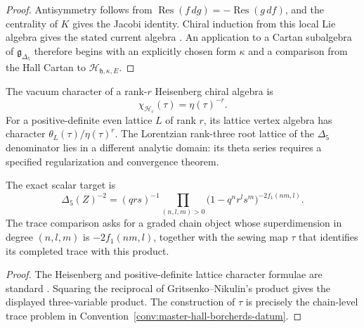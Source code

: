 \begin{proof}
Antisymmetry follows from
$\operatorname{Res}(f\,dg)=-\operatorname{Res}(g\,df)$, and the
centrality of $K$ gives the Jacobi identity.  Chiral induction from
this local Lie algebra gives the stated current algebra
\cite[\S2.5]{FrenkelBenZvi}.  An application to a Cartan subalgebra of
$\mathfrak g_{\Delta_5}$ therefore begins with an explicitly chosen
form $\kappa$ and a comparison from the Hall Cartan to
$\mathcal H_{\mathfrak h,\kappa,E}$.
\end{proof}

\begin{lemma}
\label{lem:master-tau-cartan-window}
The vacuum character of a rank-$r$ Heisenberg chiral algebra is
\[
 \chi_{\mathcal H_r}(\tau)=\eta(\tau)^{-r}.
\]
For a positive-definite even lattice $L$ of rank $r$, its lattice
vertex algebra has character $\theta_L(\tau)/\eta(\tau)^r$.  The
Lorentzian rank-three root lattice of the $\Delta_5$ denominator lies
in a different analytic domain: its theta series requires a specified
regularization and convergence theorem.

The exact scalar target is
\[
 \Delta_5(Z)^{-2}
 =(qrs)^{-1}
 \prod_{(n,l,m)>0}
 \bigl(1-q^nr^ls^m\bigr)^{-2f_1(nm,l)}.
\]
The trace comparison asks for a graded chain object whose superdimension
in degree $(n,l,m)$ is $-2f_1(nm,l)$, together with the sewing map
$\tau$ that identifies its completed trace with this product.
\end{lemma}

\begin{proof}
The Heisenberg and positive-definite lattice character formulae are
standard \cite[\S2]{FrenkelBenZvi}.  Squaring the reciprocal of
Gritsenko--Nikulin's product
\cite[Example~2.4, equation~(2.16)]{GritsenkoNikulin1998}
gives the displayed three-variable product.  The construction of
$\tau$ is precisely the chain-level trace problem in
Convention~\ref{conv:master-hall-borcherds-datum}.
\end{proof}

